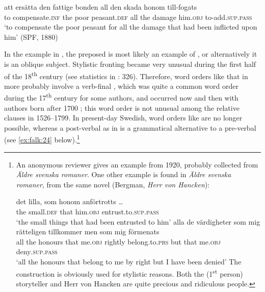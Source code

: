 \documentclass[output=paper]{langscibook}
\begin{document}
\ex\label{ex:falk:22d}
\gll att    ersätta        den  fattige  bonden    all  den  skada    honom till-fogats\\
      to    compensate.\textsc{inf}  the  poor    peasant.\textsc{def}  all  the  damage  him.\textsc{obj}         to-add\textsc{.sup.pass}\\
\glt ‘to compensate the poor peasant for all the damage that had been inflicted upon       him’ (SPF, 1880)
\z
\z

In the  example in , the preposed  is most likely an example of , or alternatively it is an oblique subject. Stylistic fronting became very unusual during the first half of the 18\textsuperscript{th} century (see statistics in \citealt{Falk1993}: 326). Therefore, word orders like that in  more probably involve a verb-final , which was quite a common word order during the 17\textsuperscript{th} century for some authors, and occurred now and then with authors born after 1700 \citep{Platzack1983}; this word order is not unusual among the relative clauses in 1526–1799. In present-day Swedish, word orders like  are no longer possible, whereas a post-verbal  as in  is a grammatical alternative to a pre-verbal  (see \ref{ex:falk:24} below).\footnote{An anonymous reviewer gives an example from 1920, probably collected from \textit{Äldre svenska romaner}. One other example is found in \textit{Äldre svenska romaner}, from the same novel (Bergman, \textit{Herr von Hancken}):

\ea \gll det  lilla,    som  honom    anförtrotts …\\
        the  small.\textsc{def}  that  him.\textsc{obj}  entrust.to.\textsc{sup.pass}\\
        \glt  ‘the small things that had been entrusted to him’
\ex  \gll alla de  värdigheter  som  mig    rätteligen  tillkommer    men  som  mig    förmenats\\
         all the  honours    that  me.\textsc{obj}  rightly    belong.to.\textsc{prs}  but  that  me.\textsc{obj}  deny\textsc{.sup.pass}\\
       \glt ‘all the honours that belong to me by right but I have been denied’
\z The construction is obviously used for stylistic reasons. Both the (1\textsuperscript{st} person) storyteller and Herr von Hancken are quite precious and ridiculous people.}
\end{document}
